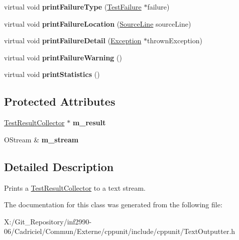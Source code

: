 \begin{DoxyCompactItemize}
\item 
\hypertarget{class_text_outputter_a95c601c6a903700450d95e13db502247}{virtual void {\bfseries print\-Failure\-Type} (\hyperlink{class_test_failure}{Test\-Failure} $\ast$failure)}\label{class_text_outputter_a95c601c6a903700450d95e13db502247}

\item 
\hypertarget{class_text_outputter_a5ba7ad1968b180ce9593373718632af9}{virtual void {\bfseries print\-Failure\-Location} (\hyperlink{class_source_line}{Source\-Line} source\-Line)}\label{class_text_outputter_a5ba7ad1968b180ce9593373718632af9}

\item 
\hypertarget{class_text_outputter_ae1a2ad2deebf4b12f803c59d867980f7}{virtual void {\bfseries print\-Failure\-Detail} (\hyperlink{class_exception}{Exception} $\ast$thrown\-Exception)}\label{class_text_outputter_ae1a2ad2deebf4b12f803c59d867980f7}

\item 
\hypertarget{class_text_outputter_a254f58361b8f5c59b60df1c007d9a438}{virtual void {\bfseries print\-Failure\-Warning} ()}\label{class_text_outputter_a254f58361b8f5c59b60df1c007d9a438}

\item 
\hypertarget{class_text_outputter_aeabfe5420c137b0a935c5b0acb45a6d8}{virtual void {\bfseries print\-Statistics} ()}\label{class_text_outputter_aeabfe5420c137b0a935c5b0acb45a6d8}

\end{DoxyCompactItemize}
\subsection*{Protected Attributes}
\begin{DoxyCompactItemize}
\item 
\hypertarget{class_text_outputter_a465e8c580e6f2db9ed021e1c44b95eb2}{\hyperlink{class_test_result_collector}{Test\-Result\-Collector} $\ast$ {\bfseries m\-\_\-result}}\label{class_text_outputter_a465e8c580e6f2db9ed021e1c44b95eb2}

\item 
\hypertarget{class_text_outputter_a947e16694e57297974e0f651d6298b80}{O\-Stream \& {\bfseries m\-\_\-stream}}\label{class_text_outputter_a947e16694e57297974e0f651d6298b80}

\end{DoxyCompactItemize}


\subsection{Detailed Description}
Prints a \hyperlink{class_test_result_collector}{Test\-Result\-Collector} to a text stream. 

The documentation for this class was generated from the following file\-:\begin{DoxyCompactItemize}
\item 
X\-:/\-Git\-\_\-\-Repository/inf2990-\/06/\-Cadriciel/\-Commun/\-Externe/cppunit/include/cppunit/Text\-Outputter.\-h\end{DoxyCompactItemize}
